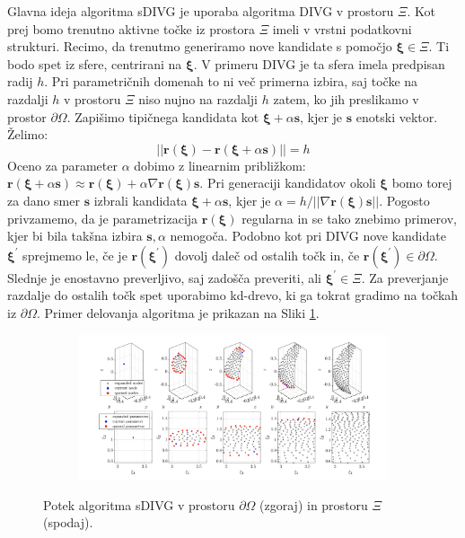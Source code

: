 \documentclass{article}
\begin{document}
Glavna ideja algoritma sDIVG je uporaba algoritma DIVG v prostoru $\Xi$. Kot prej bomo trenutno aktivne točke iz prostora $\Xi$ imeli v vrstni podatkovni strukturi. Recimo, da trenutmo generiramo nove kandidate s pomočjo $\boldsymbol{\xi} \in \Xi$. Ti bodo spet iz sfere, centrirani na $\boldsymbol{\xi}$.  V primeru DIVG je ta sfera imela predpisan radij $h$. Pri parametričnih domenah to ni več primerna izbira, saj točke na razdalji $h$ v prostoru $\Xi$ niso nujno na razdalji $h$ zatem, ko jih preslikamo v prostor $\partial \Omega$.
Zapišimo tipičnega kandidata kot $\boldsymbol{\xi} + \alpha \textbf{s}$, kjer je $\textbf{s}$ enotski vektor. Želimo:
\begin{equation}
||\textbf{r}(\boldsymbol{\xi}) - \textbf{r}(\boldsymbol{\xi} + \alpha \textbf{s})|| = h
\end{equation}
Oceno za parameter $\alpha$ dobimo z linearnim približkom: $\textbf{r}(\boldsymbol{\xi}+\alpha \textbf{s}) \approx \textbf{r}(\boldsymbol{\xi}) + \alpha \nabla \textbf{r}(\boldsymbol{\xi}) \textbf{s}$.
Pri generaciji kandidatov okoli $\boldsymbol{\xi}$ bomo torej za dano smer $\textbf{s}$ izbrali kandidata $\boldsymbol{\xi} + \alpha \textbf{s}$, kjer je $\alpha = h/||\nabla \textbf{r}(\boldsymbol{\xi}) \textbf{s}||$. Pogosto privzamemo, da je parametrizacija $\textbf{r}(\boldsymbol{\xi})$ regularna in se tako znebimo primerov, kjer bi bila takšna izbira $\textbf{s}, \alpha$ nemogoča.
Podobno kot pri DIVG nove kandidate $\boldsymbol{\xi}^\prime$ sprejmemo le, če je $\textbf{r}(\boldsymbol{\xi}^\prime)$ dovolj daleč od ostalih točk in, če $\textbf{r}(\boldsymbol{\xi}^\prime) \in \partial \Omega$. Slednje je enostavno preverljivo, saj zadošča preveriti, ali $\boldsymbol{\xi}^\prime \in \Xi$. Za preverjanje razdalje do ostalih točk spet uporabimo kd-drevo, ki ga tokrat gradimo na točkah iz $\partial \Omega$.
Primer delovanja algoritma je prikazan na Sliki \ref{fig:sdivg}.
\begin{figure}[H]
\centering
\begin{subfigure}{.8\textwidth}
\includegraphics[width=\linewidth]{Slike/sdivg.png}
\end{subfigure}
\caption{Potek algoritma sDIVG v prostoru $\partial \Omega$ (zgoraj) in prostoru $\Xi$ (spodaj).}
\label{fig:sdivg}
\end{figure}
\end{document}
